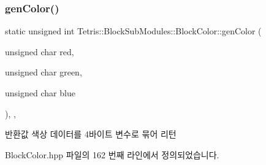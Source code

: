 \mbox{\label{class_tetris_1_1_block_sub_modules_1_1_block_color_a479cf23117afea6237a4fd69bc4652ba}} 
\subsubsection{\texorpdfstring{gen\+Color()}{genColor()}}
{\footnotesize\ttfamily static unsigned int Tetris\+::\+Block\+Sub\+Modules\+::\+Block\+Color\+::gen\+Color (\begin{DoxyParamCaption}\item[{unsigned char}]{red,  }\item[{unsigned char}]{green,  }\item[{unsigned char}]{blue }\end{DoxyParamCaption})\hspace{0.3cm}{\ttfamily [inline]}, {\ttfamily [static]}, {\ttfamily [private]}}

\begin{DoxyReturn}{반환값}
색상 데이터를 4바이트 변수로 묶어 리턴 
\end{DoxyReturn}


Block\+Color.\+hpp 파일의 162 번째 라인에서 정의되었습니다.


